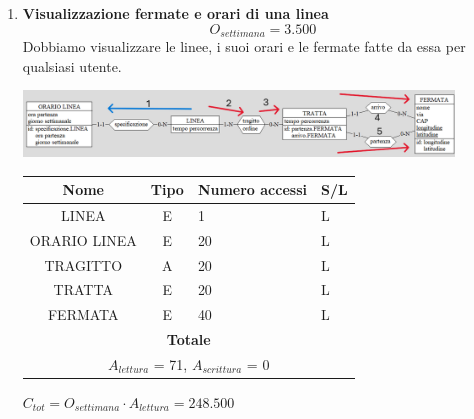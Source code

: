 \documentclass[12pt,a4paper]{report}
\begin{document}
\begin{enumerate}[label=\textbf{\arabic*}]
        \item \textbf{Visualizzazione fermate e orari di una linea} \label{op2} \\
        \[ {O_{settimana} = 3.500} \]
        Dobbiamo visualizzare le linee, i suoi orari e le fermate fatte da essa per qualsiasi utente.
        \begin{center}
	    \includegraphics[width=0.9\textwidth]{op_2}
	    \end{center}
        \begin{table}[H]
	\centering
        \begin{tabular}{|c|c|l|l|}
        \hline
        \textbf{Nome} & \textbf{Tipo} & \textbf{Numero accessi} & \textbf{S/L} \\
        \hline
        LINEA & E & 1 & L \\
        \hline
        ORARIO LINEA & E & 20 & L \\
        \hline
        TRAGITTO & A & 20 & L \\
        \hline
        TRATTA & E & 20 & L \\
        \hline
        FERMATA & E & 40 & L \\
        \hline
        \multicolumn{4}{c}{\textbf{Totale}} \\
        \multicolumn{4}{c}{${A_{lettura}}$ = 71, ${A_{scrittura}}$ = 0} \\
        \hline
        \end{tabular}
        \end{table}
        \begin{center}
        ${C_{tot} = {O_{settimana}}\cdot{A_{lettura}} = 248.500}$
        \end{center}



\end{enumerate}
\end{document}
